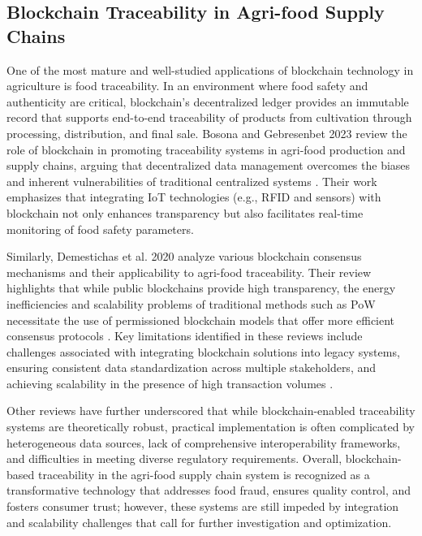 \documentclass[12pt,onecolumn]{IEEEtran} %
\begin{document}
\subsection*{Blockchain Traceability in Agri-food Supply Chains}

One of the most mature and well-studied applications of blockchain technology in agriculture is food traceability. In an environment where food safety and authenticity are critical, blockchain's decentralized ledger provides an immutable record that supports end-to-end traceability of products from cultivation through processing, distribution, and final sale. Bosona and Gebresenbet 2023 review the role of blockchain in promoting traceability systems in agri-food production and supply chains, arguing that decentralized data management overcomes the biases and inherent vulnerabilities of traditional centralized systems \cite{bosona2023theroleof}. Their work emphasizes that integrating IoT technologies (e.g., RFID and sensors) with blockchain not only enhances transparency but also facilitates real-time monitoring of food safety parameters.

Similarly, Demestichas et al. 2020 analyze various blockchain consensus mechanisms and their applicability to agri-food traceability. Their review highlights that while public blockchains provide high transparency, the energy inefficiencies and scalability problems of traditional methods such as PoW necessitate the use of permissioned blockchain models that offer more efficient consensus protocols \cite{demestichas2020blockchaininagriculture}. Key limitations identified in these reviews include challenges associated with integrating blockchain solutions into legacy systems, ensuring consistent data standardization across multiple stakeholders, and achieving scalability in the presence of high transaction volumes \cite{demestichas2020blockchaininagriculture}.

Other reviews \cite{demestichas2020blockchaininagriculture, chandan2023achievingunsdgs} have further underscored that while blockchain-enabled traceability systems are theoretically robust, practical implementation is often complicated by heterogeneous data sources, lack of comprehensive interoperability frameworks, and difficulties in meeting diverse regulatory requirements. Overall, blockchain-based traceability in the agri-food supply chain system is recognized as a transformative technology that addresses food fraud, ensures quality control, and fosters consumer trust; however, these systems are still impeded by integration and scalability challenges that call for further investigation and optimization.
\end{document}
